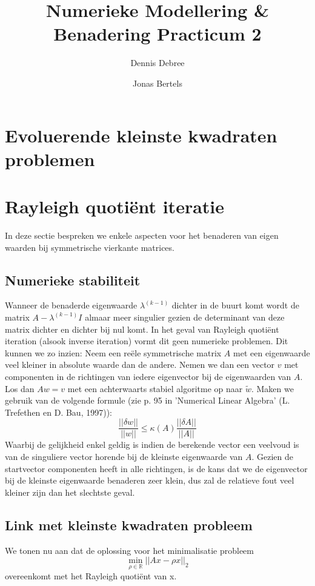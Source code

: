 \documentclass[a4paper]{article}
\title{Numerieke Modellering \& Benadering Practicum 2}
\author{Dennis Debree \and Jonas Bertels}
\begin{document}
\maketitle

\section{Evoluerende kleinste kwadraten problemen}

\section{Rayleigh quotiënt iteratie}
	In deze sectie bespreken we enkele aspecten voor het benaderen van eigen waarden bij symmetrische vierkante matrices.
\subsection{Numerieke stabiliteit}	
	Wanneer de benaderde eigenwaarde $\lambda^{(k-1)}$ dichter in de buurt komt wordt de matrix $A-\lambda^{(k-1)}I$ almaar meer singulier gezien de determinant van deze matrix dichter en dichter bij nul komt.
	In het geval van Rayleigh quotiënt iteration (alsook inverse iteration) vormt dit geen numerieke problemen.
	Dit kunnen we zo inzien:
	Neem een reële symmetrische matrix $A$ met een eigenwaarde veel kleiner in absolute waarde dan de andere.
	Nemen we dan een vector $v$ met componenten in de richtingen van iedere eigenvector bij de eigenwaarden van $A$.
	Los dan $Aw = v$ met een achterwaarts stabiel algoritme op naar $\tilde{w}$.
	Maken we gebruik van de volgende formule (zie p. 95 in 'Numerical Linear Algebra' (L. Trefethen en D. Bau, 1997)):
	\begin{equation}
		\frac{||\delta w||}{||w||}\leq \kappa (A)  \frac{||\delta A||}{||A||}
	\end{equation}
	Waarbij de gelijkheid enkel geldig is indien de berekende vector een veelvoud is van de singuliere vector horende bij de kleinste eigenwaarde van $A$. Gezien de startvector componenten heeft in alle richtingen, is de kans dat we de eigenvector bij de kleinste eigenwaarde benaderen zeer klein, dus zal de relatieve fout veel kleiner zijn dan het slechtste geval.
	\pagebreak
\subsection{Link met kleinste kwadraten probleem}		
	We tonen nu aan dat de oplossing voor het minimalisatie probleem
	\[ \min_{\rho \in \mathbb{R}} ||Ax - \rho x||_2 \]
	overeenkomt met het Rayleigh quotiënt van x.
	
\end{document}
